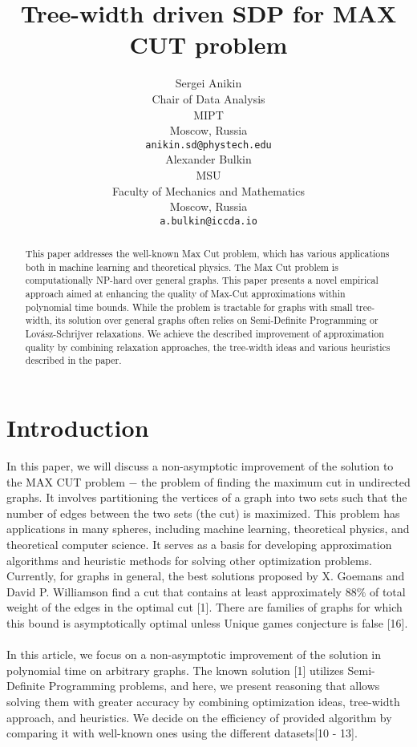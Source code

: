 \documentclass{article}
\author{ Sergei Anikin \\
	Chair of Data Analysis\\
	MIPT\\
    Moscow, Russia\\
	\texttt{anikin.sd@phystech.edu} \\
	\And
	Alexander Bulkin \\
	MSU \\
    Faculty of Mechanics and Mathematics \\
	Moscow, Russia\\
    \texttt{a.bulkin@iccda.io} \\
}
\date{}
\begin{document}
\title{Tree-width driven SDP for MAX CUT problem
}
\maketitle
\begin{abstract}
	This paper addresses the well-known Max Cut problem, which has various applications both in machine learning and theoretical physics. The Max Cut problem is computationally NP-hard over general graphs. This paper presents a novel empirical approach aimed at enhancing the quality of Max-Cut approximations within polynomial time bounds. While the problem is tractable for graphs with small tree-width, its solution over general graphs often relies on Semi-Definite Programming or Lovász-Schrijver relaxations. We achieve the described improvement of approximation quality by combining relaxation approaches, the tree-width ideas and various heuristics described in the paper.




\end{abstract}



\section{Introduction}

In this paper, we will discuss a non-asymptotic improvement of the solution to the MAX CUT problem $-$ the problem of finding the maximum cut in  undirected graphs. It involves partitioning the vertices of a graph into two sets such that the number of edges between the two sets (the cut) is maximized. This problem has applications in many spheres, including machine learning, theoretical physics, and theoretical computer science. It serves as a basis for developing approximation algorithms and heuristic methods for solving other optimization problems. Currently, for graphs in general, the best solutions proposed by X. Goemans and David P. Williamson find a cut that contains at least approximately $88\%$ of total weight of the edges in the optimal cut [1]. There are families of graphs for which this bound is asymptotically optimal unless Unique games conjecture is false [16].
\\
\\
In this article, we focus on a non-asymptotic improvement of the solution in polynomial time on arbitrary graphs. The known solution [1] utilizes Semi-Definite Programming problems, and here, we present reasoning that allows solving them with greater accuracy by combining optimization ideas, tree-width approach, and heuristics. We decide on the efficiency of provided algorithm by comparing it with well-known ones using the different datasets[10 - 13].
\end{document}
